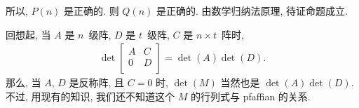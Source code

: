 \begin{example}
    所以, \(P(n)\) 是正确的.
    则 \(Q(n)\) 是正确的.
    由数学归纳法原理, 待证命题成立.

    回想起, 当 \(A\) 是 \(n\)~级阵,
    \(D\) 是 \(t\)~级阵,
    \(C\) 是 \(n \times t\)~阵时,
    \begin{align*}
        \det {
            \begin{bmatrix}
                A & C \\
                0 & D \\
            \end{bmatrix}
        }
        = \det {(A)} \det {(D)}.
    \end{align*}
    那么, 当 \(A\), \(D\) 是反称阵,
    且 \(C = 0\) 时,
    \(\det {(M)}\)
    当然也是 \(\det {(A)} \det {(D)}\).
    不过, 用现有的知识,
    我们还不知道这个 \(M\) 的行列式与 pfaffian 的关系.
\end{example}

